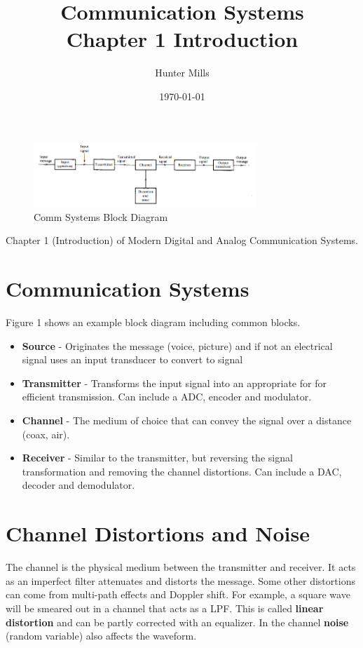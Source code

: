 \documentclass{article}
\title{Communication Systems \\
     \large Chapter 1 Introduction}
\author{Hunter Mills}
\date{\today}
\begin{document}
     \maketitle

     \begin{figure}[h]
     \centering
     \includegraphics[width=0.75\textwidth]{bd}
     \caption{Comm Systems Block Diagram}
     \end{figure}

     \medskip
     Chapter 1 (Introduction) of Modern Digital and Analog Communication Systems.

     \section{Communication Systems}
     Figure 1 shows an example block diagram including common blocks.

     \begin{itemize}
          \item \textbf{Source}        - Originates the message (voice, picture) and if not an electrical signal uses an input transducer to convert to signal
          \item \textbf{Transmitter}   - Transforms the input signal into an appropriate for for efficient transmission. Can include a ADC, encoder and modulator.
          \item \textbf{Channel}       - The medium of choice that can convey the signal over a distance (coax, air).
          \item \textbf{Receiver}      - Similar to the transmitter, but reversing the signal transformation and removing the channel distortions. 
                                             Can include a DAC, decoder and demodulator.
     \end{itemize}

     \section{Channel Distortions and Noise}
     The channel is the physical medium between the transmitter and receiver. It acts as an imperfect filter attenuates and distorts the message. Some other 
     distortions can come from multi-path effects and Doppler shift. For example, a square wave will be smeared out in a channel that acts as a LPF. This is called
     \textbf{linear distortion} and can be partly corrected with an equalizer. In the channel \textbf{noise} (random variable) also affects the waveform.
\end{document}

